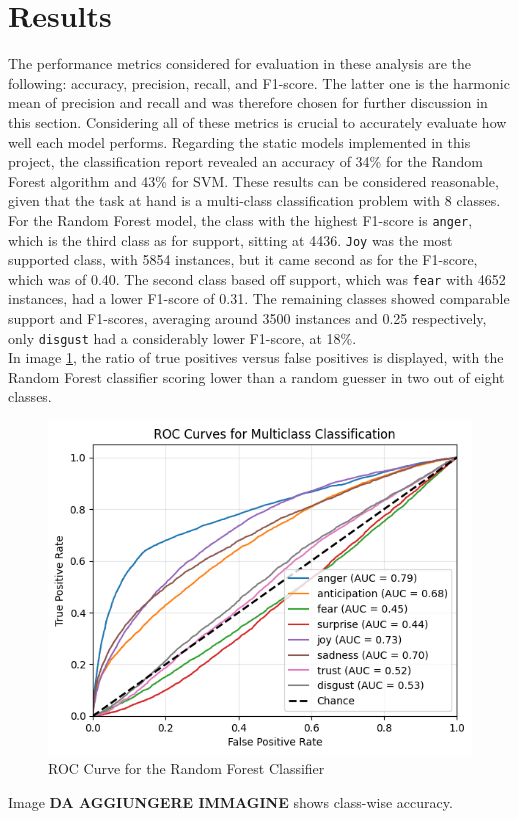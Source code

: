 \chapter*{Results}
\label{ch:results}
The performance metrics considered for evaluation in these analysis are the following: accuracy, precision,
recall, and F1-score. The latter one is the harmonic mean of precision and recall and was therefore chosen for further discussion in this section. Considering all of these metrics is crucial to accurately evaluate how well each
model performs.
Regarding the static models implemented in this project, the classification report revealed an accuracy of
34\% for the Random Forest algorithm and 43\% for SVM. These results can be considered reasonable, given that the task at hand is a multi-class classification problem with 8 classes.\\

For the Random Forest model, the class with the highest F1-score is \texttt{anger}, which is the third class as for support, sitting at 4436. 
\texttt{Joy} was the most supported class, with 5854 instances, but it came second as for the F1-score, which was of 0.40. The second class based off support, which was \texttt{fear} with 4652 instances, had a lower F1-score of 0.31. 
The remaining classes showed comparable support and F1-scores, averaging around 3500 instances and 0.25 respectively, only \texttt{disgust} had a considerably lower F1-score, at 18\%. \\
In image \ref{fig:roc_rf}, the ratio of true positives versus false positives is displayed, with the Random Forest classifier scoring lower than a random guesser in two out of eight classes. \\
\begin{figure}[H]
    \centering
    \includegraphics[width=0.5\linewidth]{pictures/roc_rf.png}
    \caption{ROC Curve for the Random Forest Classifier}
    \label{fig:roc_rf}
\end{figure}
Image \textbf{DA AGGIUNGERE IMMAGINE} shows class-wise accuracy. \\

